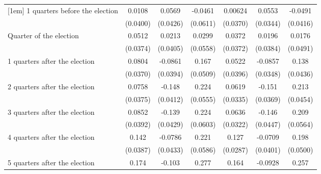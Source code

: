 \begin{table}[!ht]
\begin{tabular}{l*{6}{c}}
[1em]
 1 quarters before the election&      0.0108         &      0.0569         &     -0.0461         &     0.00624         &      0.0553         &     -0.0491         \\
                    &    (0.0400)         &    (0.0426)         &    (0.0611)         &    (0.0370)         &    (0.0344)         &    (0.0416)         \\
[1em]
Quarter of the election&      0.0512         &      0.0213         &      0.0299         &      0.0372         &      0.0196         &      0.0176         \\
                    &    (0.0374)         &    (0.0405)         &    (0.0558)         &    (0.0372)         &    (0.0384)         &    (0.0491)         \\
[1em]
 1 quarters after the election&      0.0804\sym{*}  &     -0.0861\sym{*}  &       0.167\sym{**} &      0.0522         &     -0.0857\sym{*}  &       0.138\sym{**} \\
                    &    (0.0370)         &    (0.0394)         &    (0.0509)         &    (0.0396)         &    (0.0348)         &    (0.0436)         \\
[1em]
 2 quarters after the election&      0.0758\sym{*}  &      -0.148\sym{***}&       0.224\sym{***}&      0.0619         &      -0.151\sym{***}&       0.213\sym{***}\\
                    &    (0.0375)         &    (0.0412)         &    (0.0555)         &    (0.0335)         &    (0.0369)         &    (0.0454)         \\
[1em]
 3 quarters after the election&      0.0852\sym{*}  &      -0.139\sym{**} &       0.224\sym{***}&      0.0636\sym{*}  &      -0.146\sym{**} &       0.209\sym{***}\\
                    &    (0.0392)         &    (0.0429)         &    (0.0603)         &    (0.0322)         &    (0.0447)         &    (0.0564)         \\
[1em]
 4 quarters after the election&       0.142\sym{***}&     -0.0786         &       0.221\sym{***}&       0.127\sym{***}&     -0.0709         &       0.198\sym{***}\\
                    &    (0.0387)         &    (0.0433)         &    (0.0586)         &    (0.0287)         &    (0.0401)         &    (0.0500)         \\
[1em]
 5 quarters after the election&       0.174\sym{***}&      -0.103\sym{*}  &       0.277\sym{***}&       0.164\sym{***}&     -0.0928\sym{*}  &       0.257\sym{***}\\

\end{tabular}
\end{table}
